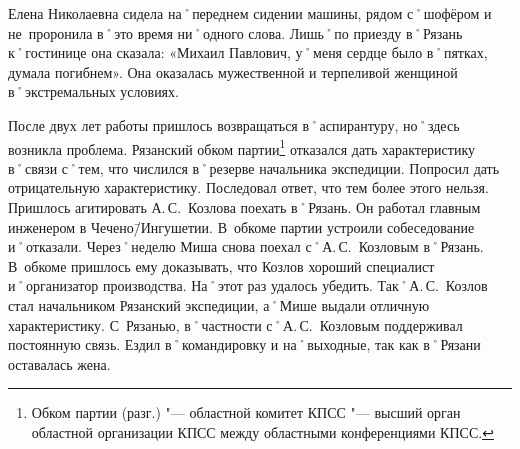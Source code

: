 Елена Николаевна сидела на˚переднем сидении машины, рядом с˚шофёром и не~проронила в˚это время ни˚одного слова. Лишь˚по приезду в˚Рязань к˚гостинице она сказала: «Михаил Павлович, у˚меня сердце было в˚пятках, думала погибнем». Она оказалась мужественной и терпеливой женщиной в˚экстремальных условиях.

После двух лет работы пришлось возвращаться в˚аспирантуру, но˚здесь возникла проблема. Рязанский обком партии\footnote{Обком партии (разг.) "--- областной комитет КПСС "--- высший орган областной организации КПСС между областными конференциями КПСС.} отказался дать характеристику в˚связи с˚тем, что числился в˚резерве начальника экспедиции. Попросил дать отрицательную характеристику. Последовал ответ, что тем более этого нельзя. Пришлось агитировать А.\,С.~Козлова поехать в˚Рязань. Он работал главным инженером в Чечено\=/Ингушетии. В~обкоме партии устроили собеседование и˚отказали. Через˚неделю Миша снова поехал с˚А.\,С.~Козловым в˚Рязань. В~обкоме пришлось ему доказывать, что Козлов хороший специалист и˚организатор производства. На˚этот раз удалось убедить. Так˚А.\,С.~Козлов стал начальником Рязанский экспедиции, а˚Мише выдали отличную характеристику. С~Рязанью, в˚частности с˚А.\,С.~Козловым поддерживал постоянную связь. Ездил в˚командировку и на˚выходные, так как в˚Рязани оставалась жена. 